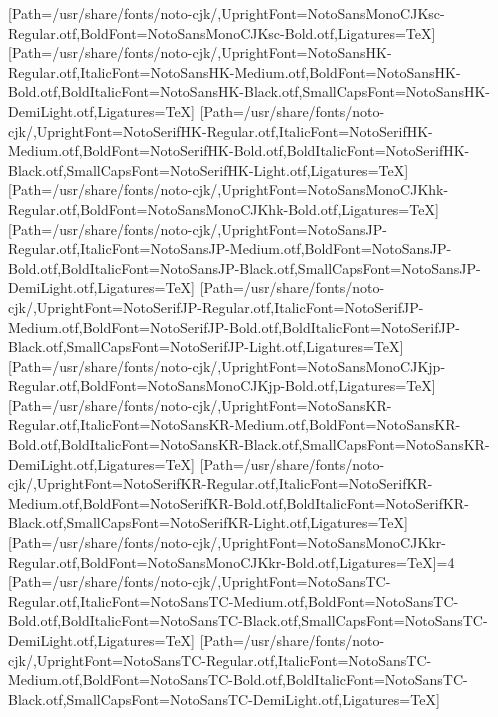 \newfontfamily{}[Path=/usr/share/fonts/noto-cjk/,UprightFont=NotoSansMonoCJKsc-Regular.otf,BoldFont=NotoSansMonoCJKsc-Bold.otf,Ligatures=TeX]
\newfontfamily{}[Path=/usr/share/fonts/noto-cjk/,UprightFont=NotoSansHK-Regular.otf,ItalicFont=NotoSansHK-Medium.otf,BoldFont=NotoSansHK-Bold.otf,BoldItalicFont=NotoSansHK-Black.otf,SmallCapsFont=NotoSansHK-DemiLight.otf,Ligatures=TeX]
\newfontfamily{}[Path=/usr/share/fonts/noto-cjk/,UprightFont=NotoSerifHK-Regular.otf,ItalicFont=NotoSerifHK-Medium.otf,BoldFont=NotoSerifHK-Bold.otf,BoldItalicFont=NotoSerifHK-Black.otf,SmallCapsFont=NotoSerifHK-Light.otf,Ligatures=TeX]
\newfontfamily{}[Path=/usr/share/fonts/noto-cjk/,UprightFont=NotoSansMonoCJKhk-Regular.otf,BoldFont=NotoSansMonoCJKhk-Bold.otf,Ligatures=TeX]
\newfontfamily{}[Path=/usr/share/fonts/noto-cjk/,UprightFont=NotoSansJP-Regular.otf,ItalicFont=NotoSansJP-Medium.otf,BoldFont=NotoSansJP-Bold.otf,BoldItalicFont=NotoSansJP-Black.otf,SmallCapsFont=NotoSansJP-DemiLight.otf,Ligatures=TeX]
\newfontfamily{}[Path=/usr/share/fonts/noto-cjk/,UprightFont=NotoSerifJP-Regular.otf,ItalicFont=NotoSerifJP-Medium.otf,BoldFont=NotoSerifJP-Bold.otf,BoldItalicFont=NotoSerifJP-Black.otf,SmallCapsFont=NotoSerifJP-Light.otf,Ligatures=TeX]
\newfontfamily{}[Path=/usr/share/fonts/noto-cjk/,UprightFont=NotoSansMonoCJKjp-Regular.otf,BoldFont=NotoSansMonoCJKjp-Bold.otf,Ligatures=TeX]
\newfontfamily{}[Path=/usr/share/fonts/noto-cjk/,UprightFont=NotoSansKR-Regular.otf,ItalicFont=NotoSansKR-Medium.otf,BoldFont=NotoSansKR-Bold.otf,BoldItalicFont=NotoSansKR-Black.otf,SmallCapsFont=NotoSansKR-DemiLight.otf,Ligatures=TeX]
\newfontfamily{}[Path=/usr/share/fonts/noto-cjk/,UprightFont=NotoSerifKR-Regular.otf,ItalicFont=NotoSerifKR-Medium.otf,BoldFont=NotoSerifKR-Bold.otf,BoldItalicFont=NotoSerifKR-Black.otf,SmallCapsFont=NotoSerifKR-Light.otf,Ligatures=TeX]
\newfontfamily{}[Path=/usr/share/fonts/noto-cjk/,UprightFont=NotoSansMonoCJKkr-Regular.otf,BoldFont=NotoSansMonoCJKkr-Bold.otf,Ligatures=TeX]\else\ifnum\value{NotoCJKFamily}=4
\newfontfamily{}[Path=/usr/share/fonts/noto-cjk/,UprightFont=NotoSansTC-Regular.otf,ItalicFont=NotoSansTC-Medium.otf,BoldFont=NotoSansTC-Bold.otf,BoldItalicFont=NotoSansTC-Black.otf,SmallCapsFont=NotoSansTC-DemiLight.otf,Ligatures=TeX]
\newfontfamily{}[Path=/usr/share/fonts/noto-cjk/,UprightFont=NotoSansTC-Regular.otf,ItalicFont=NotoSansTC-Medium.otf,BoldFont=NotoSansTC-Bold.otf,BoldItalicFont=NotoSansTC-Black.otf,SmallCapsFont=NotoSansTC-DemiLight.otf,Ligatures=TeX]
